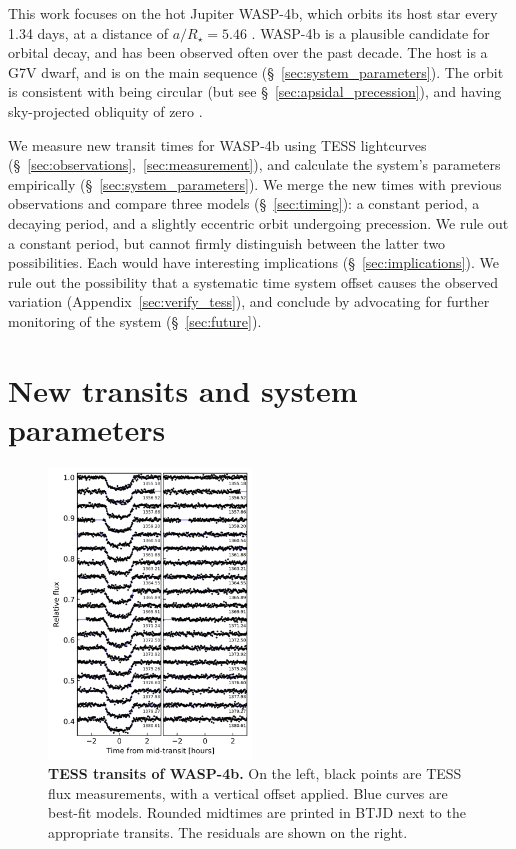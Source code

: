 \documentclass[12pt,twocolumn,tighten]{aastex62}
\begin{document}
This work focuses on the hot Jupiter WASP-4b, which orbits its host
star every 1.34 days, at a distance of $a/R_\star = 5.46$
\citep{wilson_wasp-4b_2008,hoyer_tramos_2013}.  WASP-4b is a plausible
candidate for orbital decay, and has been
observed often over the past decade.  The host is a G7V dwarf, and is on the
main sequence (\S~\ref{sec:system_parameters}).  The orbit is
consistent with being circular (but see
\S~\ref{sec:apsidal_precession}), and having sky-projected obliquity
of zero
\citep{triaud_spin-orbit_2010,beerer_secondary_2011,sanchis-ojeda_starspots_2011}.

We measure new transit times for WASP-4b using TESS lightcurves
(\S~\ref{sec:observations},~\ref{sec:measurement}), and calculate the
system's parameters empirically (\S~\ref{sec:system_parameters}).  We
merge the new times with previous observations and compare three
models (\S~\ref{sec:timing}): a constant period, a decaying period,
and a slightly eccentric orbit undergoing precession.  We rule out a
constant period, but cannot firmly distinguish between the latter two
possibilities.  Each would have interesting implications
(\S~\ref{sec:implications}).  We rule out the possibility that a
systematic time system offset causes the observed variation
(Appendix~\ref{sec:verify_tess}), and conclude by advocating for
further monitoring of the system (\S~\ref{sec:future}).



\section{New transits and system parameters}
\begin{figure}[t]
    \begin{center}
        \includegraphics[width=0.48\textwidth]{f1.png}
    \end{center}
    \vspace{-0.5cm}
    \caption{
        {\bf TESS transits of WASP-4b.} On the left, black points are
        TESS flux measurements, with a vertical offset applied. Blue
        curves are best-fit models. Rounded midtimes are printed in
        BTJD next to the appropriate transits.  The residuals are
        shown on the right.
        \label{fig:lightcurves}
    }
\end{figure}
\end{document}
